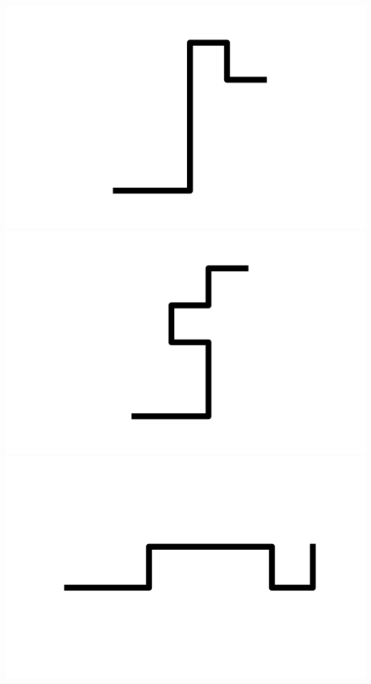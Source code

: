 \documentclass[]{report}
\begin{document}
\includegraphics[scale=.1]{pictures/21/state_cluster_shapes_178.pdf} 
\includegraphics[scale=.1]{pictures/21/state_cluster_shapes_179.pdf} 
\includegraphics[scale=.1]{pictures/21/state_cluster_shapes_180.pdf} 
\end{document}
